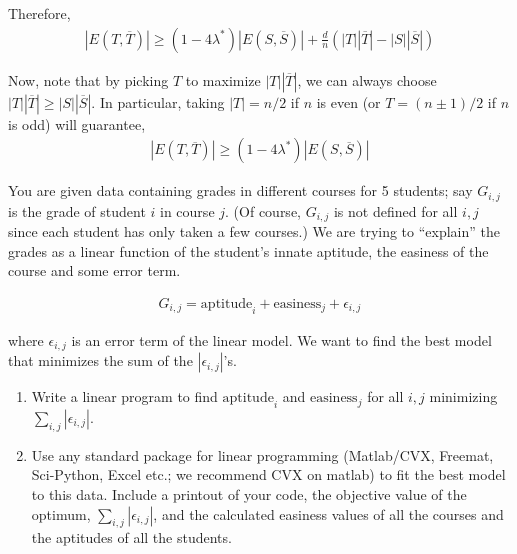 \documentclass[10pt]{article}
\begin{document}
\begin{solution}[Solution]
Therefore,
\begin{align*}
    |E(T,\overline{T})| \geq (1-4\lambda^*) |E(S,\overline{S})| + \frac{d}{n} \left( |T||\overline{T}| - |S||\overline{S}| \right)
\end{align*}

    Now, note that by picking \( T \) to maximize \( |T||\overline{T}| \), we can always choose \( |T||\overline{T}| \geq |S||\overline{S}| \). In particular, taking \( |T| = n/2 \) if \( n \) is even (or \( T = (n\pm 1)/2 \) if \( n \) is odd) will guarantee,
\begin{align*}
    |E(T,\overline{T})| \geq (1-4\lambda^*) |E(S,\overline{S})|
\end{align*}


\end{solution}


\begin{problem}[Problem 3]
You are given data containing grades in different courses for 5 students; say \(G_{i,j} \) is the grade of student \( i \) in course \( j \). (Of course, \( G_{i,j} \) is not defined for all \( i, j \) since each student has only taken a few courses.) We are trying to ``explain'' the grades as a linear function of the student’s innate aptitude, the easiness of the course and some error term.

\begin{align*}
    G_{i,j} = \text{aptitude}_i + \text{easiness}_j + \epsilon_{i,j} 
\end{align*}

    where \( \epsilon_{i,j} \) is an error term of the linear model. We want to find the best model that minimizes the sum of the \( | \epsilon_{i,j} | \)'s.

    \begin{enumerate}[label=(\alph*),nolistsep]
        \item Write a linear program to find \( \text{aptitude}_i \) and \( \text{easiness}_j \) for all \( i,j \) minimizing \( \sum_{i,j}^{} |\epsilon_{i,j}| \).
        \item Use any standard package for linear programming (Matlab/CVX, Freemat, Sci-Python, Excel etc.; we recommend CVX on matlab) to fit the best model to this data. Include a printout of your code, the objective value of the optimum, \( \sum_{i,j} |\epsilon_{i,j} |\), and the calculated easiness values of all the courses and the aptitudes of all the students.


\end{enumerate}
\end{problem}
\end{document}
